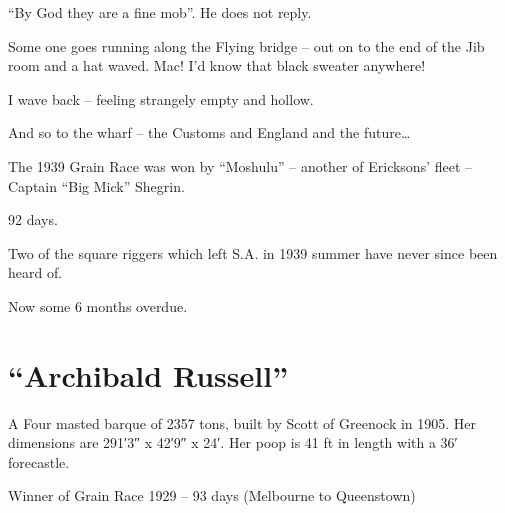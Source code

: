 \documentclass[
  11pt,
  msmallroyalvopaper
]{memoir}
\begin{document}
``By God they are a fine mob''. He does not reply.

Some one goes running along the Flying bridge -- out on to the end of
the Jib room and a hat waved. Mac! I'd know that black sweater anywhere!

I wave back -- feeling strangely empty and hollow.

And so to the wharf -- the Customs and England and the future\ldots{}

The 1939 Grain Race was won by ``Moshulu'' -- another of Ericksons'
fleet -- Captain ``Big Mick'' Shegrin.

92 days.

Two of the square riggers which left S.A. in 1939 summer have never
since been heard of.

Now some 6 months overdue.

\appendixpage

\appendix

\hypertarget{archibald-russell}{%
\chapter{“Archibald Russell”}\label{archibald-russell}}

A Four masted barque of 2357 tons, built by Scott of Greenock in 1905.
Her dimensions are 291′3″ x 42′9″ x 24′. Her poop is 41 ft in length
with a 36′ forecastle.

Winner of Grain Race 1929 -- 93 days (Melbourne to Queenstown)

\vfill
\end{document}
